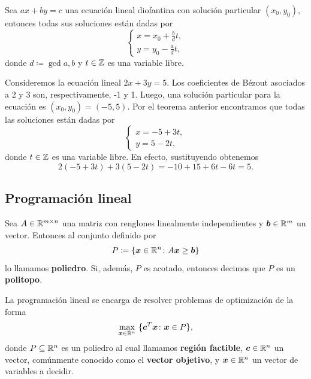 \begin{theorem}[Construcción]
	\label{prerreq:th:construction}
	Sea $ax + by = c$ una ecuación lineal diofantina con solución particular $(x_0, y_0)$, entonces
	todas sus soluciones están dadas por
	\begin{equation}
		\label{prerreq:eq:construction}
		\begin{cases}
			x = x_0 + \frac{b}{d}t, \\
			y = y_0 - \frac{a}{d}t,
		\end{cases}
	\end{equation}
	donde $d \coloneq \gcd{a, b}$ y $t \in \mathbb{Z}$ es una variable libre.
\end{theorem}

\begin{example}
	Consideremos la ecuación lineal $2x + 3y = 5$. Los coeficientes de Bézout asociados a 2 y 3 son,
	respectivamente, -1 y 1. Luego, una solución particular para la ecuación es $(x_0, y_0) = (-5, 5)$.
	Por el teorema anterior encontramos que todas las soluciones están dadas por
	\begin{equation*}
		\begin{cases}
			x = -5 + 3t, \\
			y = 5 - 2t,
		\end{cases}
	\end{equation*}
	donde $t \in \mathbb{Z}$ es una variable libre. En efecto, sustituyendo obtenemos
	\begin{equation*}
		2(-5 + 3t) + 3(5 - 2t) = -10 + 15 + 6t - 6t = 5.
	\end{equation*}
\end{example}

\subsection{Programación lineal}
\label{subsec:lp}
\noindent
\begin{definition}
	Sea $A \in \mathbb{R}^{m \times n}$ una matriz con renglones linealmente independientes y $\boldsymbol{b} \in
	\mathbb{R}^m$ un vector. Entonces al conjunto definido por
	\begin{equation}
		\label{prerreq:def:poly}
		P \coloneq \lbrace \boldsymbol{x} \in \mathbb{R}^n \colon A\boldsymbol{x} \geq \boldsymbol{b} \rbrace
	\end{equation}
	lo llamamos \textbf{poliedro}. Si, además, $P$ es acotado, entonces decimos que $P$ es un
	\textbf{politopo}.
\end{definition}

La programación lineal se encarga de resolver problemas de optimización de la forma
\begin{equation}
	\label{prim:lineal-opt}
	\max_{\boldsymbol{x} \in \mathbb{R}^n} ~\lbrace \boldsymbol{c}^T\boldsymbol{x} \colon \boldsymbol{x} \in P \rbrace,
\end{equation}
donde $P \subseteq \mathbb{R}^n$ es un poliedro al cual llamamos \textbf{región factible}, $\boldsymbol{c} \in \mathbb{R}^n$ un vector,
comúnmente conocido como el \textbf{vector objetivo}, y $\boldsymbol{x} \in \mathbb{R}^n$ un vector de variables a decidir.

